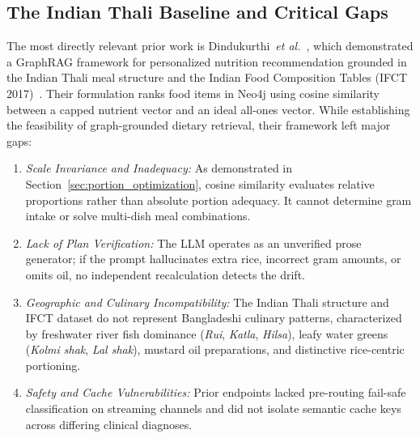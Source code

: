 \documentclass[5p,times,twocolumn]{elsarticle}
\newcommand{\etal}{\textit{et al.}}
\begin{document}
\subsection{The Indian Thali Baseline and Critical Gaps}
The most directly relevant prior work is Dindukurthi~\etal{}~\cite{dindukurthi2026graphrag}, which demonstrated a GraphRAG framework for personalized nutrition recommendation grounded in the Indian Thali meal structure and the Indian Food Composition Tables (IFCT 2017)~\cite{longvah2017ifct}. Their formulation ranks food items in Neo4j using cosine similarity between a capped nutrient vector and an ideal all-ones vector. While establishing the feasibility of graph-grounded dietary retrieval, their framework left major gaps:
\begin{enumerate}[leftmargin=*,itemsep=1.5pt]
  \item \textit{Scale Invariance and Inadequacy:} As demonstrated in Section~\ref{sec:portion_optimization}, cosine similarity evaluates relative proportions rather than absolute portion adequacy. It cannot determine gram intake or solve multi-dish meal combinations.
  \item \textit{Lack of Plan Verification:} The LLM operates as an unverified prose generator; if the prompt hallucinates extra rice, incorrect gram amounts, or omits oil, no independent recalculation detects the drift.
  \item \textit{Geographic and Culinary Incompatibility:} The Indian Thali structure and IFCT dataset do not represent Bangladeshi culinary patterns, characterized by freshwater river fish dominance (\textit{Rui}, \textit{Katla}, \textit{Hilsa}), leafy water greens (\textit{Kolmi shak}, \textit{Lal shak}), mustard oil preparations, and distinctive rice-centric portioning.
  \item \textit{Safety and Cache Vulnerabilities:} Prior endpoints lacked pre-routing fail-safe classification on streaming channels and did not isolate semantic cache keys across differing clinical diagnoses.
\end{enumerate}
\end{document}
